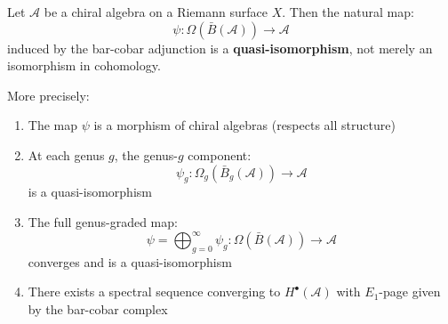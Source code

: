 \begin{theorem}\label{thm:bar-cobar-inversion-qi}
Let $\mathcal{A}$ be a chiral algebra on a Riemann surface $X$. Then the natural map:
$$\psi: \Omega(\bar{B}(\mathcal{A})) \longrightarrow \mathcal{A}$$
induced by the bar-cobar adjunction is a \textbf{quasi-isomorphism}, not merely 
an isomorphism in cohomology.

More precisely:
\begin{enumerate}
\item The map $\psi$ is a morphism of chiral algebras (respects all structure)

\item At each genus $g$, the genus-$g$ component:
      $$\psi_g: \Omega_g(\bar{B}_g(\mathcal{A})) \longrightarrow \mathcal{A}$$
      is a quasi-isomorphism
      
\item The full genus-graded map:
      $$\psi = \bigoplus_{g=0}^\infty \psi_g: \Omega(\bar{B}(\mathcal{A})) \longrightarrow \mathcal{A}$$
      converges and is a quasi-isomorphism
      
\item There exists a spectral sequence converging to $H^\bullet(\mathcal{A})$ 
      with $E_1$-page given by the bar-cobar complex
\end{enumerate}
\end{theorem}

